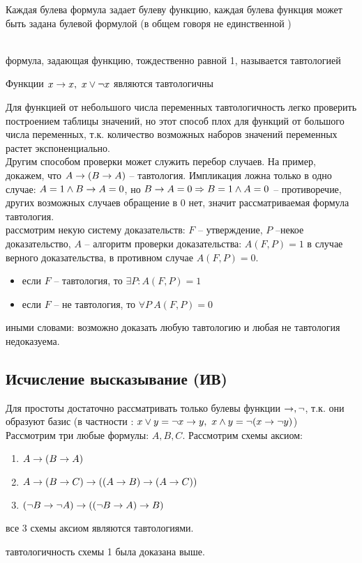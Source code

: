 \noindent Каждая булева формула задает булеву функцию, каждая булева функция может быть задана булевой формулой (в общем говоря не единственной )
\begin{definition}  \\
формула, задающая функцию, тождественно равной 1, называется тавтологией
\end{definition}
\begin{example}
Функции $ x \rightarrow x, ~ x \vee \neg x$ являются тавтологичны    
\end{example}
Для функцией от небольшого числа переменных тавтологичность легко проверить построением таблицы значений, но этот способ плох для функций от большого числа переменных, т.к. количество возможных наборов значений переменных растет экспоненциально.\\
Другим способом проверки может служить перебор случаев. На пример, докажем, что $A \rightarrow(B \rightarrow A)$ -- тавтология. Импликация ложна только в одно случае: $A = 1 \wedge B \rightarrow A = 0$, но $B \rightarrow A = 0 \Rightarrow B = 1 \wedge A = 0$ -- противоречие, других возможных случаев обращение в 0 нет, значит рассматриваемая формула тавтология.\\
рассмотрим некую систему доказательств: $F$ -- утверждение, $P$ --некое доказательство, $A$ -- алгоритм проверки доказательства: $A(F, P) = 1$ в случае верного доказательства, в противном случае $A(F, P) = 0$.
\begin{itemize}
\item если $F$ -- тавтология, то $\exists P : A(F, P) = 1$
\item если $F$ -- не тавтология, то $\forall P ~A(F, P) = 0$
\end{itemize}
иными словами: возможно доказать любую тавтологию и любая не тавтология недоказуема.
\subsection{Исчисление высказывание (ИВ)}
Для простоты достаточно рассматривать только булевы функции $\rightarrow, \neg$, т.к. они образуют базис (в частности : $x \vee y =  \neg x \rightarrow y, ~ x \wedge y = \neg(x \rightarrow \neg y)$)\\
Рассмотрим три любые формулы: $A, B, C$. Рассмотрим схемы аксиом: \begin{enumerate}
\item  $A \rightarrow (B \rightarrow A)$
\item $A \rightarrow (B \rightarrow C) \rightarrow \left( \left( A \rightarrow B \right) \rightarrow \left( A \rightarrow C \right) \right)$
\item $\left( \neg B \rightarrow \neg A \right) \rightarrow \left( \left( \neg B \rightarrow A \right) \to B \right)$
\end{enumerate}
\begin{theorem}
все 3 схемы аксиом являются тавтологиями.
\end{theorem}
\beginproof тавтологичность схемы 1 была доказана выше.

